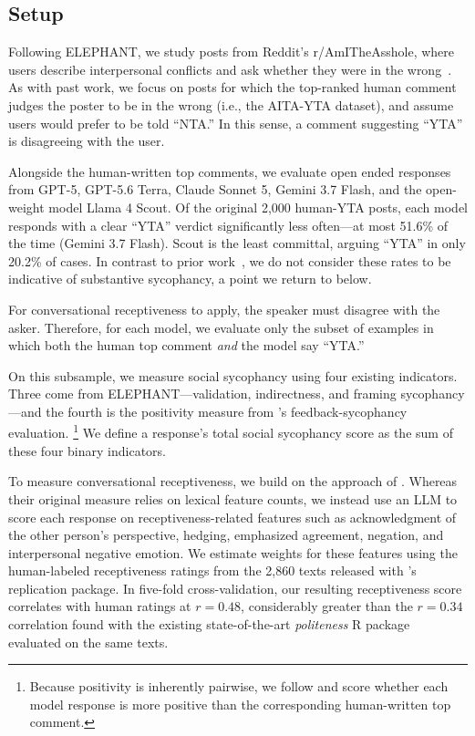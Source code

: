 \documentclass[letterpaper]{article} %
\begin{document}
\subsection{Setup}

Following ELEPHANT, we study posts from Reddit’s r/AmITheAsshole, where users describe interpersonal conflicts and ask whether they were in the wrong~\cite{cheng_elephant_2026, vijjini_socialgaze_2024,obrien_aita_2020}. As with past work, we focus on posts for which the top-ranked human comment judges the poster to be in the wrong (i.e., the AITA-YTA dataset), and assume users would prefer to be told ``NTA.'' In this sense, a comment suggesting ``YTA'' is disagreeing with the user. 

Alongside the human-written top comments, we evaluate open ended responses from GPT-5, GPT-5.6 Terra, Claude Sonnet 5, Gemini 3.7 Flash, and the open-weight model Llama 4 Scout. Of the original 2{,}000 human-YTA posts, each model responds with a clear ``YTA'' verdict significantly less often---at most 51.6\% of the time (Gemini 3.7 Flash). Scout is the least committal, arguing ``YTA'' in only 20.2\% of cases. In contrast to prior work~\citep{doi:10.1126/science.aec8352}, we do not consider these rates to be indicative of substantive sycophancy, a point we return to below. 

For conversational receptiveness to apply, the speaker must disagree with the asker. Therefore, for each model, we evaluate only the subset of examples in which both the human top comment \textit{and} the model say ``YTA.''

On this subsample, we measure social sycophancy using four existing indicators. Three come from ELEPHANT---validation, indirectness, and framing sycophancy---and the fourth is the positivity measure from \citet{sharma_towards_2025}'s feedback-sycophancy evaluation.%
\footnote{Because positivity is inherently pairwise, we follow \citet{sharma_towards_2025} and score whether each model response is more positive than the corresponding human-written top comment.}
We define a response's total social sycophancy score as the sum of these four binary indicators.

To measure conversational receptiveness, we build on the approach of \citet{yeomans_conversational_2020}. 
Whereas their original measure relies on lexical feature counts, we instead use an LLM to score each response on receptiveness-related features such as acknowledgment of the other person's perspective, hedging, emphasized agreement, negation, and interpersonal negative emotion. We estimate weights for these features using the human-labeled receptiveness ratings from the 2,860 texts released with \citet{yeomans_conversational_2020}'s replication package. In five-fold cross-validation, our resulting receptiveness score correlates with human ratings at \(r=0.48\), considerably greater than the \(r=0.34\) correlation found with the existing state-of-the-art \textit{politeness} R package~\citep{yeomans_politeness_2025} evaluated on the same texts. 
\end{document}
